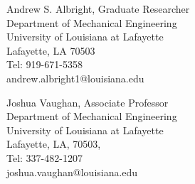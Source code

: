 \begin{minipage}[t]{.49\textwidth} %
    \begin{center} %
        {\footnotesize
        {\hvb Andrew S. Albright}, {\hv Graduate Researcher} \\
        {\hv
        Department of Mechanical Engineering \\
        University of Louisiana at Lafayette\\
        Lafayette, LA 70503\\
        Tel: 919-671-5358\\ 
        andrew.albright1@louisiana.edu
        }} 
    \end{center}
\end{minipage}
\begin{minipage}[t]{.49\textwidth} %
    \begin{center}
        {\footnotesize
        {\hvb Joshua Vaughan}, {\hv Associate Professor} \\
        {\hv
        Department of Mechanical Engineering \\
        University of Louisiana at Lafayette\\
        Lafayette, LA, 70503, \\
        Tel: 337-482-1207\\ 
        joshua.vaughan@louisiana.edu
        }}
    \end{center}
\end{minipage}

